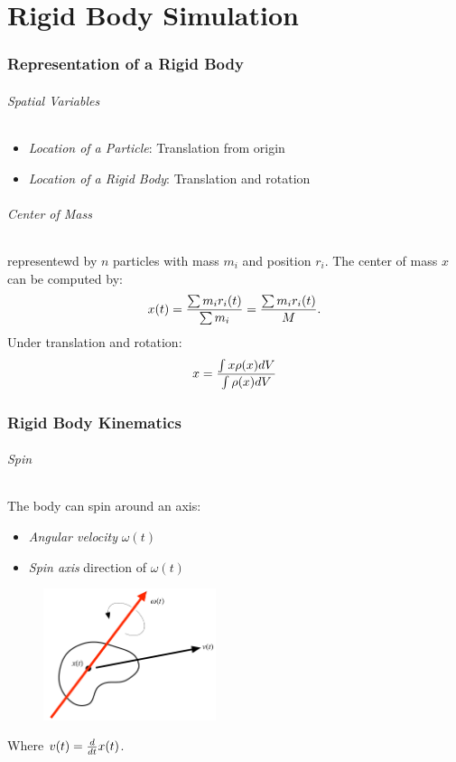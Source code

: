 \part{Rigid Body Simulation}
\begin{multicols}{2}
\section{Representation of a Rigid Body}
\paragraph{Spatial Variables}
\begin{itemize}
\item \emph{Location of a Particle}: Translation from origin
\item \emph{Location of a Rigid Body}: Translation and rotation
\end{itemize}

\paragraph{Center of Mass} representewd by $n$ particles with mass $m_i$ and position $r_i$. The center of mass $x$ can be computed by:
\begin{align*}
	x(t) = {\sum m_i r_i(t) \over \sum m_i} = {\sum m_i r_i(t) \over M}.
\end{align*}
Under translation and rotation:
\begin{align*}
 x = {\int x\rho(x) dV \over \int \rho(x) dV}
\end{align*}
\section{Rigid Body Kinematics}
\paragraph{Spin} The body can spin around an axis:
\begin{itemize}
	\item \emph{Angular velocity} $\omega(t)$
	\item \emph{Spin axis} direction of $\omega(t)$
\end{itemize}
\begin{figure}[H]
	\centering
	\includegraphics[width=0.45\textwidth]{img/04_spin}
\end{figure}
Where $v(t) = {d\over dt}x(t)$.



\end{multicols}
